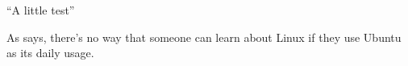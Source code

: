 \documentclass{article}
\begin{document}
``A little test''

As \textcite{test} says, there's no way that someone can learn about Linux if
they use Ubuntu as its daily usage.

\printbibliography
\end{document}
